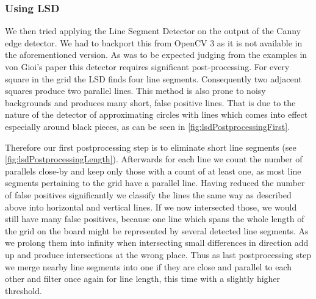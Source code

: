 	\subsubsection{Using LSD}
	\label{detector-visible-lsd}
	We then tried applying the Line Segment Detector \cite{von2012lsd} on the output of the Canny edge detector. We had to backport this from OpenCV 3 as it is not available in the aforementioned version. As was to be expected judging from the examples in von Gioi's paper this detector requires significant post-processing. For every square in the grid the LSD finds four line segments. Consequently two adjacent squares produce two parallel lines. This method is also prone to noisy backgrounds and produces many short, false positive lines. That is due to the nature of the detector of approximating circles with lines which comes into effect especially around black pieces, as can be seen in \ref{fig:lsdPostprocessingFirst}.

	Therefore our first postprocessing step is to eliminate short line segments (see \ref{fig:lsdPostprocessingLength}). Afterwards for each line we count the number of parallels close-by and keep only those with a count of at least one, as most line segments pertaining to the grid have a parallel line. Having reduced the number of false positives significantly we classify the lines the same way as described above into horizontal and vertical lines. If we now intersected those, we would still have many false positives, because one line which spans the whole length of the grid on the board might be represented by several detected line segments. As we prolong them into infinity when intersecting small differences in direction add up and produce intersections at the wrong place. Thus as last postprocessing step we merge nearby line segments into one if they are close and parallel to each other and filter once again for line length, this time with a slightly higher threshold.

